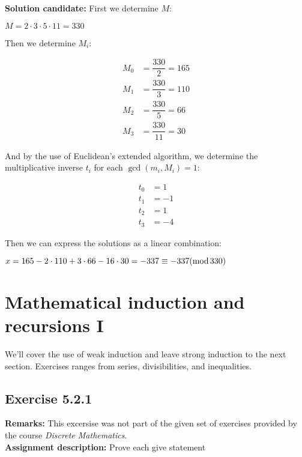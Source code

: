 \documentclass{report}
\newcommand{\cent}[1]{\begin{center}#1\end{center}}
\newcommand{\mAlign}[1]{\begin{align*}#1\end{align*}}
\newcommand{\assignmentDescription}{\textbf{Assignment description: }}
\newcommand{\myRemark}{\textbf{Remarks: }}
\newcommand{\solution}{\textbf{Solution candidate: }}
\newcommand{\Exercise}[1]{\subsection{Exercise #1}}
\newcommand{\defaultEnumerateLabel}{\textbf{\alph*.}}
\newcommand{\modInline}{\text{mod\,}}
\begin{document}
\begin{enumerate}[label=\defaultEnumerateLabel]
	\solution
	First we determine $M$:
	
	\cent{$M = 2 \cdot 3 \cdot 5 \cdot 11 = 330$}
	
	Then we determine $M_i$:
	
	\mAlign{
		M_0 &= \dfrac{330}{2} = 165 \\
		M_1 &= \dfrac{330}{3} = 110 \\
		M_2 &= \dfrac{330}{5} = 66 \\
		M_3 &= \dfrac{330}{11} = 30
	}
	
	And by the use of Euclidean's extended algorithm, we determine the multiplicative inverse $t_i$ for each $\gcd(m_i,M_i) = 1$:
	
	\mAlign{
		t_0 &= 1 \\
		t_1 &= -1 \\
		t_2 &= 1 \\
		t_3 &= -4
	}
	
	Then we can express the solutions as a linear combination:
	
	\cent{$x=165 - 2 \cdot 110 + 3 \cdot 66 - 16 \cdot 30 = -337 \equiv -337 (\modInline 330)$}
	
	\end{enumerate}
 	
 	\section{Mathematical induction and recursions I}
 	
 	We'll cover the use of weak induction and leave strong induction to the next section. Exercises ranges from series, divisibilities, and inequalities. 
 	\Exercise{5.2.1}
 	\myRemark
 	This excersise was not part of the given set of exercises provided by the course \textit{Discrete Mathematics}.\\
 	
 	\assignmentDescription
 	Prove each give statement
 	
\end{document}
